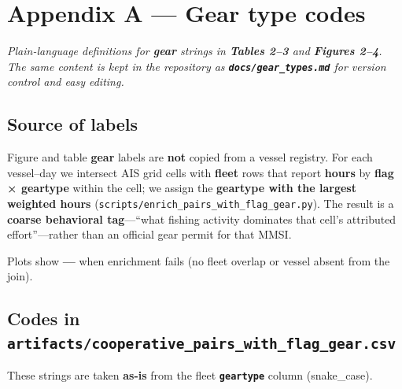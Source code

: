 \documentclass[
]{article}
\begin{document}
\clearpage

\section*{Appendix A --- Gear type
codes}\label{appendix-a-gear-type-codes}

\emph{Plain-language definitions for \textbf{gear} strings in
\textbf{Tables 2--3} and \textbf{Figures 2--4}. The same content is kept
in the repository as \textbf{\texttt{docs/gear\_types.md}} for version
control and easy editing.}

\subsection*{Source of labels}\label{source-of-labels}

Figure and table \textbf{gear} labels are \textbf{not} copied from a
vessel registry. For each vessel--day we intersect AIS grid cells with
\textbf{fleet} rows that report \textbf{hours} by \textbf{flag ×
geartype} within the cell; we assign the \textbf{geartype with the
largest weighted hours}
(\texttt{scripts/enrich\_pairs\_with\_flag\_gear.py}). The result is a
\textbf{coarse behavioral tag}---``what fishing activity dominates that
cell's attributed effort''---rather than an official gear permit for
that MMSI.

Plots show \textbf{---} when enrichment fails (no fleet overlap or
vessel absent from the join).

\subsection*{\texorpdfstring{Codes in
\texttt{artifacts/cooperative\_pairs\_with\_flag\_gear.csv}}{Codes in artifacts/cooperative\_pairs\_with\_flag\_gear.csv}}\label{codes-in-artifactscooperative_pairs_with_flag_gear.csv}

These strings are taken \textbf{as-is} from the fleet
\textbf{\texttt{geartype}} column (snake\_case).
\end{document}
